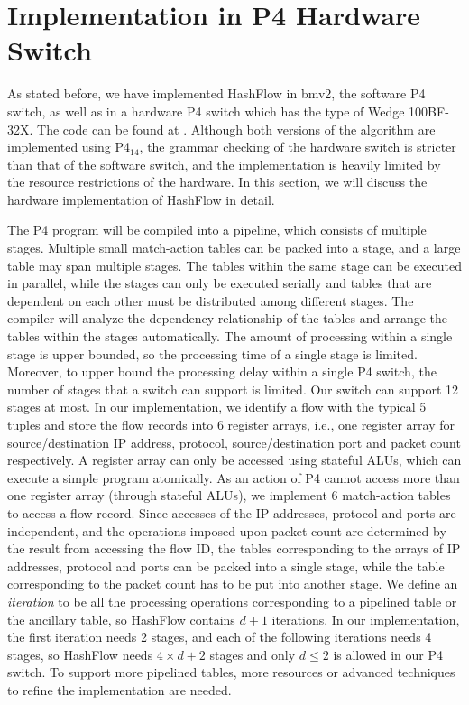 \section{Implementation in P4 Hardware Switch}
\label{section:implementation}
As stated before, we have implemented HashFlow in bmv2, the software P4 switch, as well as in a hardware P4 switch which has the type of Wedge 100BF-32X\cite{noauthor_edgecore_nodate}. The code can be found at \cite{zhao_hashflow_2018}. Although both versions of the algorithm are implemented using P4$_{14}$, the grammar checking of the hardware switch is stricter than that of the software switch, and the implementation is heavily limited by the resource restrictions of the hardware. In this section, we will discuss the hardware implementation of HashFlow in detail.

The P4 program will be compiled into a pipeline, which consists of multiple stages. Multiple small match-action tables can be packed into a stage, and a large table may span multiple stages. The tables within the same stage can be executed in parallel, while the stages can only be executed serially and tables that are dependent on each other must be distributed among different stages. The compiler will analyze the dependency relationship of the tables and arrange the tables within the stages automatically. The amount of processing within a single stage is upper bounded, so the processing time of a single stage is limited. Moreover, to upper bound the processing delay within a single P4 switch, the number of stages that a switch can support is limited. Our switch can support 12 stages at most.
In our implementation, we identify a flow with the typical 5 tuples and store the flow records into 6 register arrays, i.e., one register array for source/destination IP address, protocol, source/destination port and packet count respectively. A register array can only be accessed using stateful ALUs, which can execute a simple program atomically. As an action of P4 cannot access more than one register array (through stateful ALUs), we implement 6 match-action tables to access a flow record. Since accesses of the IP addresses, protocol and ports are independent, and the operations imposed upon packet count are determined by the result from accessing the flow ID, the tables corresponding to the arrays of IP addresses, protocol and ports can be packed into a single stage, while the table corresponding to the packet count has to be put into another stage. We define an \emph{iteration} to be all the processing operations corresponding to a pipelined table or the ancillary table, so HashFlow contains $d+1$ iterations. In our implementation, the first iteration needs 2 stages, and each of the following iterations needs 4 stages, so HashFlow needs $4\times d + 2$ stages and only $d\le 2$ is allowed in our P4 switch. To support more pipelined tables, more resources or advanced techniques to refine the implementation are needed.

